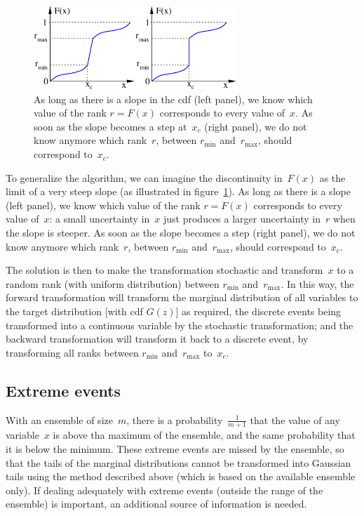 \documentclass[11pt]{article}
\begin{document}
\begin{figure}[htbp]
\centerline{
\includegraphics[width=0.685\textwidth]{Figures/ensanam_discrete_event.pdf}
}
\caption{As long as there is a slope in the cdf (left panel),
we know which value of the rank $r=F(x)$ corresponds to every value of~$x$.
As soon as the slope becomes a step at~$x_c$ (right panel),
we do not know anymore which rank~$r$, between $r_{\min}$ and~$r_{\max}$,
should correspond to~$x_c$.
\label{fig:anadiscrete}}
\end{figure}

To generalize the algorithm, we can imagine the discontinuity in~$F(x)$
as the limit of a very steep slope (as illustrated in figure~\ref{fig:anadiscrete}).
As long as there is a slope (left panel), we know which value of the rank $r=F(x)$
corresponds to every value of~$x$: a small uncertainty in~$x$ just produces
a larger uncertainty in~$r$ when the slope is steeper.
As soon as the slope becomes a step (right panel),
we do not know anymore which rank~$r$, between $r_{\min}$ and~$r_{\max}$,
should correspond to~$x_c$.

The solution is then to make the transformation stochastic and transform~$x$
to a random rank (with uniform distribution) between $r_{\min}$ and~$r_{\max}$.
In this way, the forward transformation will transform the marginal distribution
of all variables to the target distribution [with cdf $G(z)$] as required,
the discrete events being transformed into a continuous variable
by the stochastic transformation; and the backward transformation
will transform it back to a discrete event, by transforming all ranks
between $r_{\min}$ and~$r_{\max}$ to~$x_c$.

\subsection{Extreme events}
\label{sec:extreme}

With an ensemble of size~$m$, there is a probability~$\frac{1}{m+1}$
that the value of any variable~$x$ is above tha maximum of the ensemble,
and the same probability that it is below the minimum.
These extreme events are missed by the ensemble,
so that the tails of the marginal distributions cannot be transformed
into Gaussian tails using the method described above
(which is based on the available ensemble only).
If dealing adequately with extreme events
(outside the range of the ensemble) is important,
an additional source of information is needed.
\end{document}
